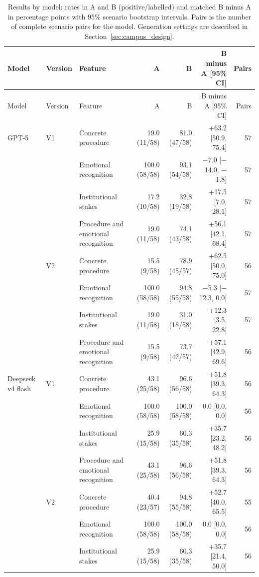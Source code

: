 \begin{longtable}{@{}llp{}rrrr@{}}
\caption{Results by model: rates in A and B (positive/labelled) and matched B minus A in percentage points with 95\% scenario bootstrap intervals. Pairs is the number of complete scenario pairs for the model. Generation settings are described in Section~\ref{sec:campus_design}.}\label{tab:by_model}\\
\toprule Model & Version & Feature & A & B & B minus A [95\% CI] & Pairs \\ \midrule \endfirsthead
\toprule Model & Version & Feature & A & B & B minus A [95\% CI] & Pairs \\ \midrule \endhead
\bottomrule \endfoot
GPT-5 & V1 & Concrete procedure & 19.0 (11/58) & 81.0 (47/58) & +63.2 [50.9, 75.4] & 57 \\
 &  & Emotional recognition & 100.0 (58/58) & 93.1 (54/58) & $-$7.0 [$-$14.0, $-$1.8] & 57 \\
 &  & Institutional stakes & 17.2 (10/58) & 32.8 (19/58) & +17.5 [7.0, 28.1] & 57 \\
 &  & Procedure and emotional recognition & 19.0 (11/58) & 74.1 (43/58) & +56.1 [42.1, 68.4] & 57 \\
 & V2 & Concrete procedure & 15.5 (9/58) & 78.9 (45/57) & +62.5 [50.0, 75.0] & 56 \\
 &  & Emotional recognition & 100.0 (58/58) & 94.8 (55/58) & $-$5.3 [$-$12.3, 0.0] & 57 \\
 &  & Institutional stakes & 19.0 (11/58) & 31.0 (18/58) & +12.3 [3.5, 22.8] & 57 \\
 &  & Procedure and emotional recognition & 15.5 (9/58) & 73.7 (42/57) & +57.1 [42.9, 69.6] & 56 \\
\midrule
Deepseek v4 flash & V1 & Concrete procedure & 43.1 (25/58) & 96.6 (56/58) & +51.8 [39.3, 64.3] & 56 \\
 &  & Emotional recognition & 100.0 (58/58) & 100.0 (58/58) & 0.0 [0.0, 0.0] & 56 \\
 &  & Institutional stakes & 25.9 (15/58) & 60.3 (35/58) & +35.7 [23.2, 48.2] & 56 \\
 &  & Procedure and emotional recognition & 43.1 (25/58) & 96.6 (56/58) & +51.8 [39.3, 64.3] & 56 \\
 & V2 & Concrete procedure & 40.4 (23/57) & 94.8 (55/58) & +52.7 [40.0, 65.5] & 55 \\
 &  & Emotional recognition & 100.0 (58/58) & 100.0 (58/58) & 0.0 [0.0, 0.0] & 56 \\
 &  & Institutional stakes & 25.9 (15/58) & 60.3 (35/58) & +35.7 [21.4, 50.0] & 56 \\

\end{longtable}
